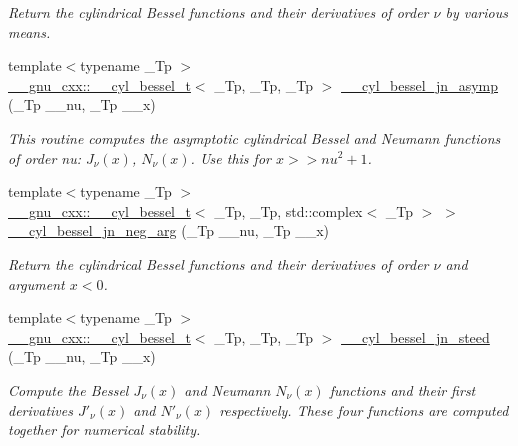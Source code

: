 \begin{DoxyCompactItemize}
\begin{DoxyCompactList}\small\item\em Return the cylindrical Bessel functions and their derivatives of order $ \nu $ by various means. \end{DoxyCompactList}\item 
{\footnotesize template$<$typename \+\_\+\+Tp $>$ }\\\hyperlink{struct____gnu__cxx_1_1____cyl__bessel__t}{\+\_\+\+\_\+gnu\+\_\+cxx\+::\+\_\+\+\_\+cyl\+\_\+bessel\+\_\+t}$<$ \+\_\+\+Tp, \+\_\+\+Tp, \+\_\+\+Tp $>$ \hyperlink{namespacestd_1_1____detail_aeab3c6b4c96d8885871d2973b77e537f}{\+\_\+\+\_\+cyl\+\_\+bessel\+\_\+jn\+\_\+asymp} (\+\_\+\+Tp \+\_\+\+\_\+nu, \+\_\+\+Tp \+\_\+\+\_\+x)
\begin{DoxyCompactList}\small\item\em This routine computes the asymptotic cylindrical Bessel and Neumann functions of order nu\+: $ J_{\nu}(x) $, $ N_{\nu}(x) $. Use this for $ x >> nu^2 + 1 $. \end{DoxyCompactList}\item 
{\footnotesize template$<$typename \+\_\+\+Tp $>$ }\\\hyperlink{struct____gnu__cxx_1_1____cyl__bessel__t}{\+\_\+\+\_\+gnu\+\_\+cxx\+::\+\_\+\+\_\+cyl\+\_\+bessel\+\_\+t}$<$ \+\_\+\+Tp, \+\_\+\+Tp, std\+::complex$<$ \+\_\+\+Tp $>$ $>$ \hyperlink{namespacestd_1_1____detail_a82d890270a5a8697d4af64c390b4b0e4}{\+\_\+\+\_\+cyl\+\_\+bessel\+\_\+jn\+\_\+neg\+\_\+arg} (\+\_\+\+Tp \+\_\+\+\_\+nu, \+\_\+\+Tp \+\_\+\+\_\+x)
\begin{DoxyCompactList}\small\item\em Return the cylindrical Bessel functions and their derivatives of order $ \nu $ and argument $ x < 0 $. \end{DoxyCompactList}\item 
{\footnotesize template$<$typename \+\_\+\+Tp $>$ }\\\hyperlink{struct____gnu__cxx_1_1____cyl__bessel__t}{\+\_\+\+\_\+gnu\+\_\+cxx\+::\+\_\+\+\_\+cyl\+\_\+bessel\+\_\+t}$<$ \+\_\+\+Tp, \+\_\+\+Tp, \+\_\+\+Tp $>$ \hyperlink{namespacestd_1_1____detail_a92e231f659735cf87c67a35f5ac4dd36}{\+\_\+\+\_\+cyl\+\_\+bessel\+\_\+jn\+\_\+steed} (\+\_\+\+Tp \+\_\+\+\_\+nu, \+\_\+\+Tp \+\_\+\+\_\+x)
\begin{DoxyCompactList}\small\item\em Compute the Bessel $ J_\nu(x) $ and Neumann $ N_\nu(x) $ functions and their first derivatives $ J'_\nu(x) $ and $ N'_\nu(x) $ respectively. These four functions are computed together for numerical stability. \end{DoxyCompactList}\item 

\end{DoxyCompactItemize}

